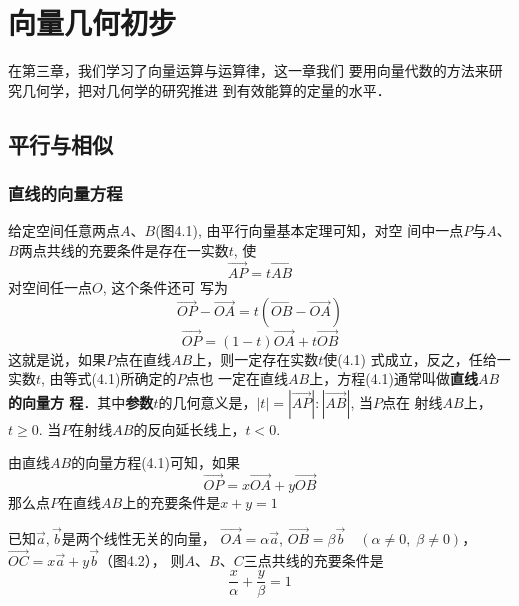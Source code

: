 \chapter{向量几何初步}
在第三章，我们学习了向量运算与运算律，这一章我们
要用向量代数的方法来研究几何学，把对几何学的研究推进
到有效能算的定量的水平．

\section{平行与相似}
\subsection{直线的向量方程}
\begin{figure}[htp]
    \centering
{}
    \caption{}
\end{figure}

给定空间任意两点$A$、$B$(图4.1), 由平行向量基本定理可知，对空
间中一点$P$与$A$、$B$两点共线的充要条件是存在一实数$t$, 使
\[\Vec{AP}=t\Vec{AB}\]
对空间任一点$O$, 这个条件还可
写为
\[\Vec{OP}-\Vec{OA}=t\left(\Vec{OB}-\Vec{OA}\right)\]
\begin{equation}
    \Vec{OP}=(1-t)\Vec{OA}+t\Vec{OB}
\end{equation}
这就是说，如果$P$点在直线$AB$上，则一定存在实数$t$使(4.1)
式成立，反之，任给一实数$t$, 由等式(4.1)所确定的$P$点也
一定在直线$AB$上，方程(4.1)通常叫做\textbf{直线$AB$的向量方
程}．其中\textbf{参数}$t$的几何意义是，$|t|=|\Vec{AP}|:|\Vec{AB}|$, 当$P$点在
射线$AB$上，$t\ge 0$. 当$P$在射线$AB$的反向延长线上，$t<0$.

由直线$AB$的向量方程(4.1)可知，如果
\[\Vec{OP}=x\Vec{OA}+y\Vec{OB}\]
那么点$P$在直线$AB$上的充要条件是$x+y=1$

\begin{example}
    已知$\vec{a},\vec{b}$是两个线性无关的向量，
$\Vec{OA}=\alpha\vec{a}$, $\Vec{OB}=\beta\vec{b}\quad (\alpha\ne 0,\;\beta\ne 0)$，$\Vec{OC}=x\vec{a}+y\vec{b}$（图4.2），
则$A$、$B$、$C$三点共线的充要条件是
\[\frac{x}{\alpha}+\frac{y}{\beta}=1\]
\end{example}

